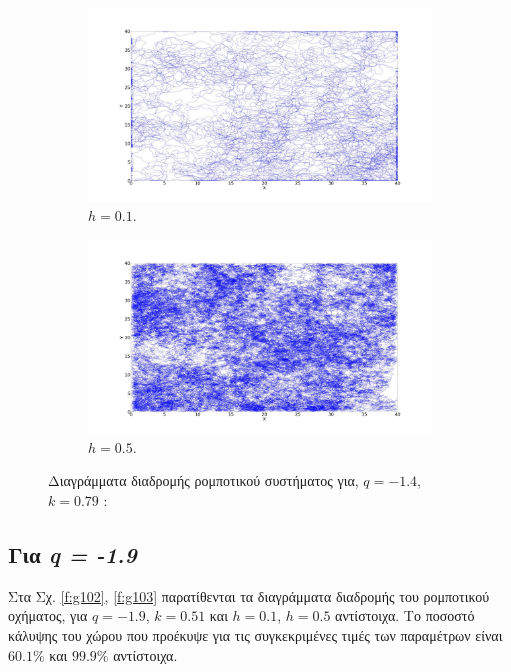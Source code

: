 \begin{figure}[ht]
	\centering
	\begin{subfigure}[b]{0.55\textwidth}
		\centering
		\includegraphics[width=\textwidth]{LateX images/log/h/g1-1.4}
		\caption{$h =0.1$.}
		\label{f:g100}
	\end{subfigure}
	\hfill
	\begin{subfigure}[b]{0.55\textwidth}
		\centering
		\includegraphics[width=\textwidth]{LateX images/log/h/g2-1.4}
		\caption{$h =0.5$.}
		\label{f:g101}
	\end{subfigure}
	\hfill
	\caption{Διαγράμματα διαδρομής ρομποτικού συστήματος για, $q = -1.4$, $k = 0.79$ :}
\end{figure}

\clearpage
\subsection{Για \emph{q = -1.9}}

Στα Σχ. \ref{f:g102}, \ref{f:g103} παρατίθενται τα διαγράμματα διαδρομής του ρομποτικού οχήματος, για $q = -1.9$, $k = 0.51$ και $h =0.1$, $h =0.5$ αντίστοιχα. Tο ποσοστό κάλυψης του χώρου που προέκυψε για τις συγκεκριμένες τιμές των παραμέτρων είναι $60.1\%$ και $99.9\%$ αντίστοιχα.

